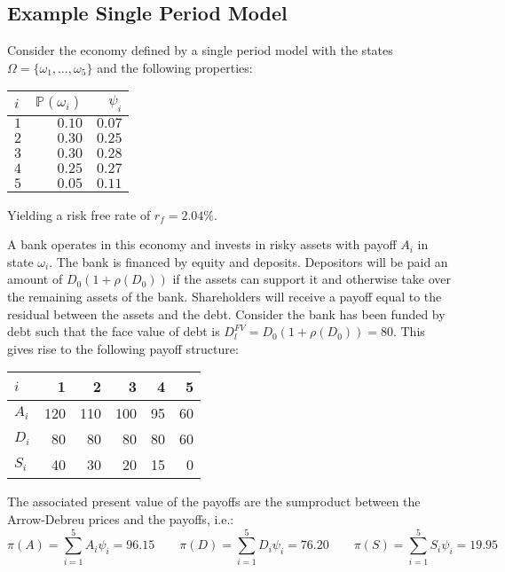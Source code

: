 \documentclass[10pt,a4paper]{article}
\begin{document}
    \subsection{Example Single Period Model}
        Consider the economy defined by a single period model with the states $\Omega = \{\omega_{1}, \dots, \omega_{5}\}$ and the following properties:
            \begin{table}[H]
                \centering
                \begin{tabular}{l|rr}
                    $i$ & $\mathbb{P}\left(\omega_{i}\right) $ & $\psi_{i}$ \\
                    \hline
                    $1$ & $0.10$ & $0.07$ \\
                    $2$ & $0.30$ & $0.25$ \\
                    $3$ & $0.30$ & $0.28$ \\
                    $4$ & $0.25$ & $0.27$ \\
                    $5$ & $0.05$ & $0.11$ \\
                \end{tabular}
            \end{table}

        Yielding a risk free rate of $r_{f} = 2.04\%$.

        A bank operates in this economy and invests in risky assets with payoff $A_{i}$ in state $\omega_{i}$. The bank is financed by equity and deposits. Depositors will be paid an amount of $D_{0}(1+\rho(D_{0}))$ if the assets can support it and otherwise take over the remaining assets of the bank. Shareholders will receive a payoff equal to the residual between the assets and the debt. Consider the bank has been funded by debt such that the face value of debt is $D_{l}^{FV} = D_{0}(1+\rho(D_{0})) = 80$. This gives rise to the following payoff structure:
            \begin{table}[H]
                \centering
                \begin{tabular}{l|rrrrr}
                    $i$ & 1 & 2 & 3 & 4 & 5 \\ 
                    \hline
                    $A_{i}$ & 120 & 110 & 100 & 95 & 60 \\
                    $D_{i}$ & 80 & 80 & 80 & 80 & 60 \\
                    $S_{i}$ & 40 & 30 & 20 & 15 & 0
                \end{tabular}
            \end{table}
        The associated present value of the payoffs are the sumproduct between the Arrow-Debreu prices and the payoffs, i.e.:
            \begin{equation}
                \pi(A) = \sum_{i=1}^{5} A_{i}\psi_{i} = 96.15 
                \qquad 
                \pi(D) = \sum_{i=1}^{5} D_{i}\psi_{i} = 76.20 
                \qquad 
                \pi(S) = \sum_{i=1}^{5} S_{i}\psi_{i} = 19.95 
            \end{equation}
\end{document}
